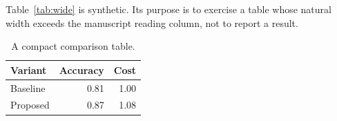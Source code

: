 Table~\ref{tab:wide} is synthetic. Its purpose is to exercise a table whose
natural width exceeds the manuscript reading column, not to report a result.

\begin{table}[t]
  \centering
  \caption{A compact comparison table.}
  \label{tab:compact}
  \begin{tabular}{lrr}
    \toprule
    Variant & Accuracy & Cost \\
    \midrule
    Baseline & 0.81 & 1.00 \\
    Proposed & 0.87 & 1.08 \\
    \bottomrule
  \end{tabular}
\end{table}

